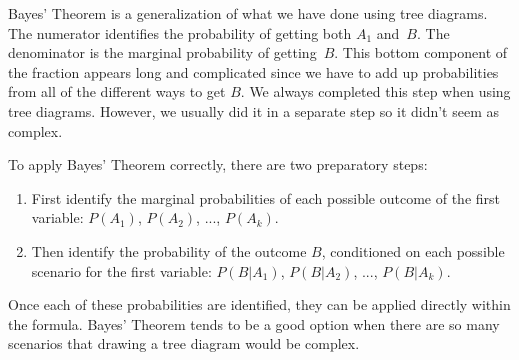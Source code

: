 Bayes' Theorem is a generalization of what we have done
using tree diagrams.
The numerator identifies the probability of getting both
$A_1$ and~$B$.
The denominator is the marginal probability of getting~$B$.
This bottom component of the fraction appears long and
complicated since we have to add up probabilities from all of the different ways to get $B$. We always completed this step when using tree diagrams. However, we usually did it in a separate step so it didn't seem as complex.

\noindent%
To apply Bayes' Theorem correctly, there are two preparatory steps:
\begin{enumerate}
\setlength{\itemsep}{0mm}
\item[(1)] First identify the marginal probabilities of each possible outcome of the first variable: $P(A_1)$, $P(A_2)$, ..., $P(A_k)$.
\item[(2)] Then identify the probability of the outcome $B$, conditioned on each possible scenario for the first variable: $P(B | A_1)$, $P(B | A_2)$, ..., $P(B | A_k)$.
\end{enumerate}
Once each of these probabilities are identified, they can be applied directly within the formula.
Bayes' Theorem tends to be a good option when there are so many scenarios that drawing a tree diagram would be complex.


